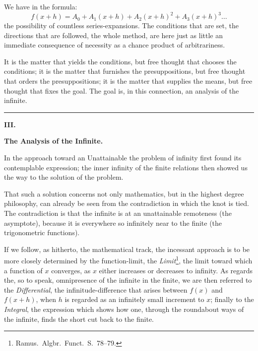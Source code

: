 \documentclass[12pt]{book}
\begin{document}
We have in the formula:
\[
f(x+h) = A_0 + A_1(x+h) + A_2(x+h)^{2} + A_3(x+h)^{3}\dots
\]
the possibility of countless series-expansions. The conditions that are set, the
directions that are followed, the whole method, are here just as little an immediate
consequence of necessity as a chance product of arbitrariness.

It is the matter that yields the conditions, but free thought that chooses the
conditions; it is the matter that furnishes the presuppositions, but free thought
that orders the presuppositions; it is the matter that supplies the means, but free
thought that fixes the goal. The goal is, in this connection, an analysis of the
infinite.

\begin{center}\rule{2.5cm}{0.4pt}\end{center}

\begin{center}
  {\large\bfseries III.}\par\vspace{4pt}
  {\Large\bfseries The Analysis of the Infinite.}
\end{center}
{}

In the approach toward an Unattainable the problem of infinity first found its
contemplable expression; the inner infinity of the finite relations
then showed us the way to the solution of the problem.

That such a solution concerns not only mathematics, but in the highest degree
philosophy, can already be seen from the contradiction in which the knot is tied. The
contradiction is that the infinite is at an unattainable remoteness (the asymptote),
because it is everywhere so infinitely near to the finite (the trigonometric
functions).

If we follow, as hitherto, the mathematical track, the incessant approach is to be
more closely determined by the function-limit, the \emph{Limit}\footnote{Ramus.\
Algbr.\ Funct.\ S.\ 78--79.}, the limit toward which a function of $x$ converges, as
$x$ either increases or decreases to infinity. As regards the, so to speak,
omnipresence of the infinite in the finite, we are then referred to the
\emph{Differential}, the infinitude-difference that arises between $f(x)$ and
$f(x+h)$, when $h$ is regarded as an infinitely small increment to $x$; finally to
the \emph{Integral}, the expression which shows how one, through the roundabout ways
of the infinite, finds the short cut back to the finite.
\end{document}
